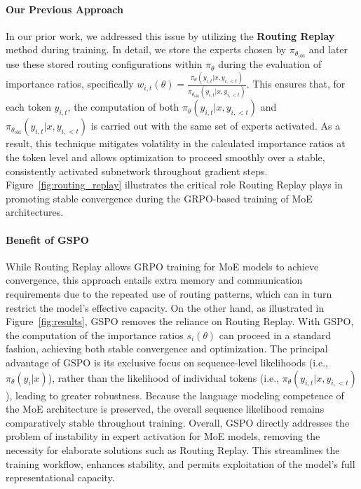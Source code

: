 \paragraph{Our Previous Approach} In our prior work, we addressed this issue by utilizing the \textbf{Routing Replay} method during training. In detail, we store the experts chosen by $\pi_{\theta_\text{old}}$ and later use these stored routing configurations within $\pi_{\theta}$ during the evaluation of importance ratios, specifically $w_{i,t}(\theta) = \frac{ \pi_{\theta} (y_{i,t} | x, y_{i,<t}) }{ \pi_{\theta_\text{old}} (y_{i,t} | x,y_{i,<t})}$. This ensures that, for each token $y_{i,t}$, the computation of both $\pi_{\theta} (y_{i,t} | x, y_{i,<t})$ and $\pi_{\theta_\text{old}} (y_{i,t} | x,y_{i,<t})$ is carried out with the same set of experts activated. As a result, this technique mitigates volatility in the calculated importance ratios at the token level and allows optimization to proceed smoothly over a stable, consistently activated subnetwork throughout gradient steps. Figure~\ref{fig:routing_replay} illustrates the critical role Routing Replay plays in promoting stable convergence during the GRPO-based training of MoE architectures.

\paragraph{Benefit of GSPO} While Routing Replay allows GRPO training for MoE models to achieve convergence, this approach entails extra memory and communication requirements due to the repeated use of routing patterns, which can in turn restrict the model’s effective capacity. On the other hand, as illustrated in Figure~\ref{fig:results}, GSPO removes the reliance on Routing Replay. With GSPO, the computation of the importance ratios $s_i(\theta)$ can proceed in a standard fashion, achieving both stable convergence and optimization. The principal advantage of GSPO is its exclusive focus on sequence-level likelihoods (i.e., $\pi_{\theta} (y_i | x)$), rather than the likelihood of individual tokens (i.e., $\pi_{\theta} (y_{i,t} | x, y_{i,<t})$), leading to greater robustness. Because the language modeling competence of the MoE architecture is preserved, the overall sequence likelihood remains comparatively stable throughout training. Overall, GSPO directly addresses the problem of instability in expert activation for MoE models, removing the necessity for elaborate solutions such as Routing Replay. This streamlines the training workflow, enhances stability, and permits exploitation of the model’s full representational capacity.

